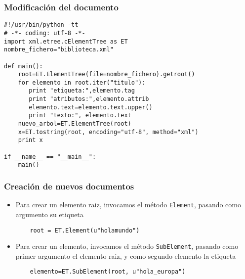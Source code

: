 \documentclass[ucs]{beamer}
\begin{document}
\begin{frame}[fragile]
\frametitle{Modificación del documento}

  \begin{footnotesize}
  \begin{verbatim}
#!/usr/bin/python -tt
# -*- coding: utf-8 -*-
import xml.etree.cElementTree as ET
nombre_fichero="biblioteca.xml"

def main():
    root=ET.ElementTree(file=nombre_fichero).getroot()
    for elemento in root.iter("titulo"):
       print "etiqueta:",elemento.tag
       print "atributos:",elemento.attrib
       elemento.text=elemento.text.upper()
       print "texto:", elemento.text
    nuevo_arbol=ET.ElementTree(root)
    x=ET.tostring(root, encoding="utf-8", method="xml")
    print x

if __name__ == "__main__":
    main()
  \end{verbatim}
  \end{footnotesize}

\end{frame}

\begin{frame}[fragile]
\frametitle{Creación de nuevos documentos}
\begin{itemize}
\item
Para crear un elemento raiz, invocamos el método \verb|Element|, pasando
como argumento su etiqueta
  \begin{footnotesize}
  \begin{verbatim}
    root = ET.Element(u"holamundo")
  \end{verbatim}
  \end{footnotesize}


\item
Para crear un elemento, invocamos el método \verb|SubElement|, pasando como
primer argumento el elemento raiz, y como segundo elemento la etiqueta

  \begin{footnotesize}
  \begin{verbatim}
    elemento=ET.SubElement(root, u"hola_europa")
  \end{verbatim}
  \end{footnotesize}

\end{itemize}
\end{frame}
\end{document}
